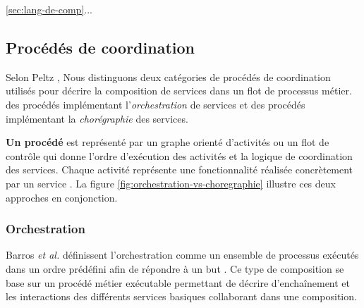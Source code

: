     \ref{sec:lang-de-comp}...
    \newpage


      \subsection{Procédés de coordination}
      \label{sec:proc-de-coord}

      Selon Peltz \cite{peltz2003web}, Nous distinguons deux
      catégories de procédés de coordination utilisés pour décrire la
      composition de services dans un flot de processus métier. des
      procédés implémentant l'\emph{orchestration} de services et des
      procédés implémentant la \emph{chorégraphie} des services.


      

      \textbf{Un procédé} est représenté par un graphe orienté
      d'activités ou un flot de contrôle qui donne l'ordre d'exécution
      des activités et la logique de coordination des services. Chaque
      activité représente une fonctionnalité réalisée concrètement par
      un service \cite{chollet2009orchestration}. La figure
      \ref{fig:orchestration-vs-choregraphie} illustre ces deux
      approches en conjonction.


        \subsubsection{Orchestration}
        \label{sec:orchestration}
        Barros \emph{et al.} \cite{barros2006standards} définissent
        l'orchestration comme un ensemble de processus exécutés dans
        un ordre prédéfini afin de répondre à un but
        \cite{lopez2008selection}. Ce type de composition se base sur
        un procédé métier exécutable permettant de décrire
        d'enchaînement et les interactions des différents services
        basiques collaborant dans une composition.

